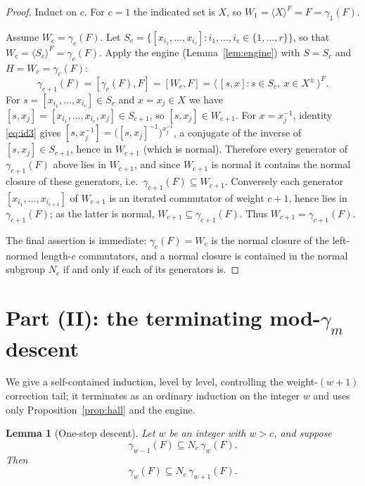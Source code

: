 \documentclass{amsart}
\newtheorem{lemma}{Lemma}
\theoremstyle{definition}
\theoremstyle{remark}
\begin{document}
\begin{proof}
Induct on $c$. For $c=1$ the indicated set is $X$, so $W_1=\langle X\rangle^F=F=\gamma_1(F)$.

Assume $W_c=\gamma_c(F)$. Let
$S_c=\{[x_{i_1},\dots,x_{i_c}]:i_1,\dots,i_c\in\{1,\dots,r\}\}$, so that
$W_c=\langle S_c\rangle^{F}=\gamma_c(F)$. Apply the engine
(Lemma~\ref{lem:engine}) with $S=S_c$ and $H=W_c=\gamma_c(F)$:
\[
\gamma_{c+1}(F)=[\gamma_c(F),F]=[W_c,F]
=\big\langle\,[s,x] : s\in S_c,\ x\in X^{\pm}\,\big\rangle^{F}.
\]
For $s=[x_{i_1},\dots,x_{i_c}]\in S_c$ and $x=x_j\in X$ we have
$[s,x_j]=[x_{i_1},\dots,x_{i_c},x_j]\in S_{c+1}$, so $[s,x_j]\in W_{c+1}$. For
$x=x_j^{-1}$, identity \eqref{eq:id3} gives
$[s,x_j^{-1}]=\big([s,x_j]^{-1}\big)^{x_j^{-1}}$, a conjugate of the inverse of
$[s,x_j]\in S_{c+1}$, hence in $W_{c+1}$ (which is normal). Therefore every
generator of $\gamma_{c+1}(F)$ above lies in $W_{c+1}$, and since $W_{c+1}$ is
normal it contains the normal closure of these generators, i.e.\
$\gamma_{c+1}(F)\subseteq W_{c+1}$. Conversely each generator
$[x_{i_1},\dots,x_{i_{c+1}}]$ of $W_{c+1}$ is an iterated commutator of weight
$c+1$, hence lies in $\gamma_{c+1}(F)$; as the latter is normal,
$W_{c+1}\subseteq\gamma_{c+1}(F)$. Thus $W_{c+1}=\gamma_{c+1}(F)$.

The final assertion is immediate: $\gamma_c(F)=W_c$ is the normal closure of the
left-normed length-$c$ commutators, and a normal closure is contained in the
normal subgroup $N_c$ if and only if each of its generators is.
\end{proof}

\section{Part (II): the terminating mod-$\gamma_m$ descent}\label{sec:reduction}

We give a self-contained induction, level by level, controlling the
weight-$(w{+}1)$ correction tail; it terminates as an ordinary induction on the
integer $w$ and uses only Proposition~\ref{prop:hall} and the engine.

\begin{lemma}[One-step descent]\label{lem:onestep}
Let $w$ be an integer with $w>c$, and suppose
\begin{equation}\label{eq:hyp-w-1}
\gamma_{w-1}(F)\subseteq N_c\,\gamma_{w}(F).
\end{equation}
Then
\begin{equation}\label{eq:concl-w}
\gamma_{w}(F)\subseteq N_c\,\gamma_{w+1}(F).
\end{equation}
\end{lemma}
\end{document}
